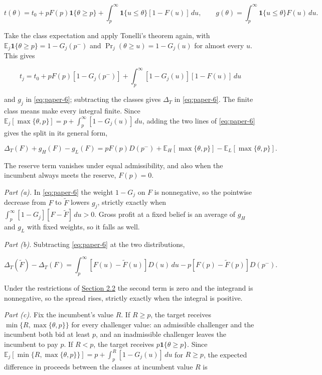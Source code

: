 \[
t(\theta)=t_0+pF(p)\mathbf1\{\theta\ge p\}
+\int_p^\infty\mathbf1\{u\le\theta\}[1-F(u)]\,du,\qquad
g(\theta)=\int_p^\infty\mathbf1\{u\le\theta\}F(u)\,du .
\]

Take the class expectation and apply Tonelli's theorem again, with
\(\mathbb E_j\mathbf1\{\theta\ge p\}=1-G_j(p^-)\) and
\(\Pr_j(\theta\ge u)=1-G_j(u)\) for almost every \(u\). This gives

\[
t_j=t_0+pF(p)[1-G_j(p^-)]+\int_p^\infty[1-G_j(u)][1-F(u)]\,du
\]

and \(g_j\) in \eqref{eq:paper-6}; subtracting the classes gives
\(\Delta_T\) in \eqref{eq:paper-6}. The finite class means make every
integral finite. Since
\(\mathbb E_j[\max\{\theta,p\}]=p+\int_p^\infty[1-G_j(u)]\,du\), adding
the two lines of \eqref{eq:paper-6} gives the split in its general form,

\[
\Delta_T(F)+g_H(F)-g_L(F)
=pF(p)D(p^-)+\mathbb E_H[\max\{\theta,p\}]-\mathbb E_L[\max\{\theta,p\}].
\]

The reserve term vanishes under equal admissibility, and also when the
incumbent always meets the reserve, \(F(p)=0\).

\emph{Part (a).} In \eqref{eq:paper-6} the weight \(1-G_j\) on \(F\) is
nonnegative, so the pointwise decrease from \(F\) to \(\tilde F\) lowers
\(g_j\), strictly exactly when
\(\int_p^\infty[1-G_j][F-\tilde F]\,du>0\). Gross profit at a fixed
belief is an average of \(g_H\) and \(g_L\) with fixed weights, so it
falls as well.

\emph{Part (b).} Subtracting \eqref{eq:paper-6} at the two
distributions,

\[
\Delta_T(\tilde F)-\Delta_T(F)
=\int_p^\infty[F(u)-\tilde F(u)]D(u)\,du-p[F(p)-\tilde F(p)]D(p^-).
\]

Under the restrictions of
\hyperref[sec-values-preparation-and-the-sale]{Section 2.2} the second
term is zero and the integrand is nonnegative, so the spread rises,
strictly exactly when the integral is positive.

\emph{Part (c).} Fix the incumbent's value \(R\). If \(R\ge p\), the
target receives \(\min\{R,\max\{\theta,p\}\}\) for every challenger
value: an admissible challenger and the incumbent both bid at least
\(p\), and an inadmissible challenger leaves the incumbent to pay \(p\).
If \(R<p\), the target receives \(p\mathbf1\{\theta\ge p\}\). Since
\(\mathbb E_j[\min\{R,\max\{\theta,p\}\}]=p+\int_p^R[1-G_j(u)]\,du\)
for \(R\ge p\), the expected difference in proceeds between the classes
at incumbent value \(R\) is

